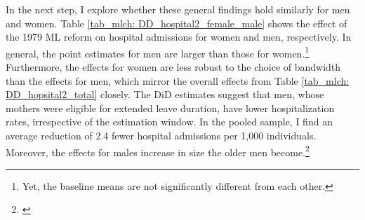 In the next step, I explore whether these general findings hold similarly for men and women. Table \ref{tab_mlch: DD_hospital2_female_male} shows the effect of the 1979 ML reform on hospital admissions for women and men, respectively. In general, the point estimates for men are larger than those for women.\footnote{Yet, the baseline means are not significantly different from each other.} Furthermore, the effects for women are less robust to the choice of bandwidth than the effects for men, which mirror the overall effects from Table \ref{tab_mlch: DD_hopsital2_total} closely. The DiD estimates suggest that men, whose mothers were eligible for extended leave duration, have lower hospitalization rates, irrespective of the estimation window. In the pooled sample, I find an average reduction of 2.4 fewer hospital admissions per 1,000 individuals. Moreover, the effects for males increase in size the older men become.\footnote{ \label{rev_mlch: editor_interaction_TxA_agegroups}} 



